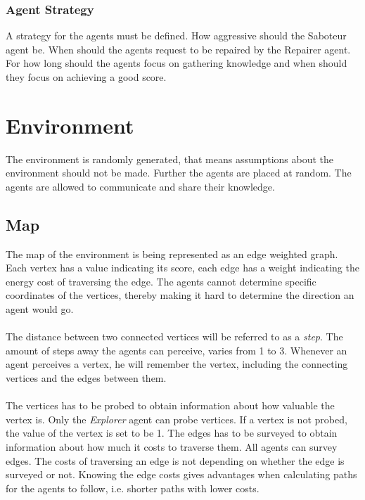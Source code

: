 \documentclass[11pt]{article}
\begin{document}
\subsubsection{Agent Strategy}
A strategy for the agents must be defined. How aggressive should the Saboteur agent be. When should the agents request to be repaired by the Repairer agent. For how long should the agents focus on gathering knowledge and when should they focus on achieving a good score.

\section{Environment}
The environment is randomly generated, that means assumptions about the environment should not be made. Further the agents are placed at random. The agents are allowed to communicate and share their knowledge.

\subsection{Map}
The map of the environment is being represented as an edge weighted graph. Each vertex has a value indicating its score, each edge has a weight indicating the energy cost of traversing the edge. The agents cannot determine specific coordinates of the vertices, thereby making it hard to determine the direction an agent would go.\\
\\
The distance between two connected vertices will be referred to as a \emph{step}. The amount of steps away the agents can perceive, varies from 1 to 3. Whenever an agent perceives a vertex, he will remember the vertex, including the connecting vertices and the edges between them.\\
\\
The vertices has to be probed to obtain information about how valuable the vertex is. Only the \emph{Explorer} agent can probe vertices. If a vertex is not probed, the value of the vertex is set to be 1. The edges has to be surveyed to obtain information about how much it costs to traverse them. All agents can survey edges. The costs of traversing an edge is not depending on whether the edge is surveyed or not. Knowing the edge costs gives advantages when calculating paths for the agents to follow, i.e. shorter paths with lower costs.
\end{document}

